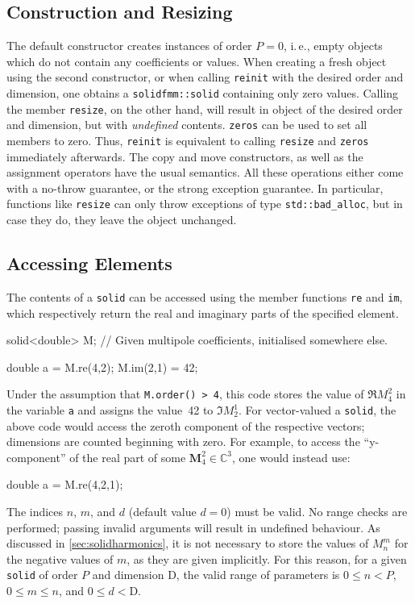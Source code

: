 \documentclass{scrbook}
\newcommand{\complex}{\mathbb{C}}
\newcommand{\vv}[1]{\ensuremath{\symbf{#1}}} %
\begin{document}
\subsection{Construction and Resizing}
The default constructor creates instances of order $P=0$, i.\,e., empty objects
which do not contain any coefficients or values. When creating a fresh object
using the second constructor, or when calling \lstinline|reinit| with the
desired order and dimension, one obtains a \lstinline|solidfmm::solid|
containing only zero values. Calling the member \lstinline|resize|, on the
other hand, will result in object of the desired order and dimension, but with
\emph{undefined} contents. \lstinline|zeros| can be used to set all members to
zero. Thus, \lstinline|reinit| is equivalent to calling \lstinline|resize| and
\lstinline|zeros| immediately afterwards. The copy and move constructors, as
well as the assignment operators have the usual semantics. All these operations
either come with a no-throw guarantee, or the strong exception guarantee.
In particular, functions like \lstinline|resize| can only throw exceptions of
type \lstinline|std::bad_alloc|, but in case they do, they leave the object
unchanged.

\subsection{Accessing Elements}
The contents of a \lstinline|solid| can be accessed using the member functions
\lstinline|re| and \lstinline|im|, which respectively return the real and
imaginary parts of the specified element.
\begin{cppcode*}
solid<double> M; // Given multipole coefficients, initialised somewhere else.

double a = M.re(4,2);
M.im(2,1) = 42;
\end{cppcode*}
Under the assumption that \lstinline|M.order() > 4|, this code stores the value
of $\Re M_4^2$ in the variable \lstinline|a| and assigns the value~42 to
$\Im M_2^1$. For vector-valued a \lstinline|solid|, the above code would access
the zeroth component of the respective vectors; dimensions are counted
beginning with zero. For example, to access the \enquote{y-component} of the
real part of some $\vv{M}_4^2\in\complex^3$, one would instead use:
\begin{cppcode*}
double a = M.re(4,2,1);
\end{cppcode*}

The indices $n$, $m$, and $d$ (default value $d=0$) must be valid. No range
checks are performed; passing invalid arguments will result in undefined
behaviour. As discussed in \cref{sec:solidharmonics}, it is not necessary to
store the values of $M_n^m$ for the negative values of $m$, as they are given
implicitly. For this reason, for a given \lstinline|solid| of order $P$ and
dimension $\mathrm{D}$, the valid range of parameters is $0\leq n < P$,
$0\leq m\leq n$, and $0\leq d < \mathrm{D}$.
\end{document}
